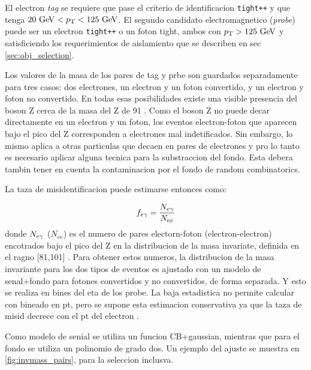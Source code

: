 El electron \emph{tag} se requiere que pase el criterio de identificacion \texttt{tight++}
y que tenga $20 \gev < \pt < 125 \gev$.
El segundo candidato electromagnetico (\emph{probe}) puede ser un electron \texttt{tight++}
o un foton tight, ambos con $\pt > 125\gev$ y satisficiendo los requerimientos de aislamiento
que se describen en sec \ref{sec:obj_selection}.

Los valores de la masa de los pares de tag y prbe son guardados separadamente para tres casos:
dos electrones, un electron y un foton convertido, y un electron y foton no convertido.
En todas esas posibilidades existe una visible presencia del boson Z cerca de la masa del Z de 91 \gev.
Como el boson Z no puede decar directamente en un electron y un foton, los eventos electron-foton
que aparecen bajo el pico del Z corresponden a electrones mal indetificados. Sin embargo, lo mismo
aplica a otras particulas que decaen en pares de electrones y pro lo tanto es necesario aplicar alguna
tecnica para la substraccion del fondo. Esta debera tambin tener en cuenta la contaminacion por el
fondo de random combinatorics.

La taza de misidentificacion puede estimarse entonces como:

\begin{equation}\label{eq:efakerate}
  f_{e\gamma} = \frac{N_{e\gamma}}{N_{ee}}
\end{equation}
%
donde $N_{e\gamma}$ ($N_{ee}$) es el numero de pares electorn-foton (electron-electron) encotrados
bajo el pico del Z en la distribucion de la masa invariate, definida en el ragno [81,101] \gev.
Para obtener estos numeros, la distribucion de la masa invariante para los dos tipos de eventos
es ajustado con un modelo de senal+fondo para fotones convertidos y no convertidos, de forma
separada. Y esto se realiza en bines del eta de los probe. La baja estadistica no permite calcular
con bineado en pt, pero se supone esta estimacion conservativa ya que la taza de misid decrece con el pt
del electron \cite{Kuhl:1604846}.

Como modelo de senial se utiliza un funcion CB+gaussian, mientras que para el fondo se utiliza un
polinomio de grado dos. Un ejemplo del ajuste se muestra en {\fig} \ref{fig:invmass_pairs}, para
la seleccion inclusva.

